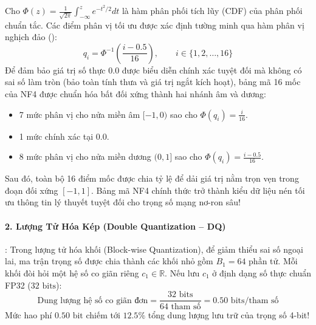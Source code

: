 Cho $\Phi(z) = \frac{1}{\sqrt{2\pi}} \int_{-\infty}^z e^{-t^2/2} dt$ là hàm phân phối tích lũy (CDF) của phân phối chuẩn tắc. Các điểm phân vị tối ưu được xác định tường minh qua hàm phân vị nghịch đảo ():
\begin{equation}
\label{eq:nf4-quantile-formula}
q_i = \Phi^{-1}\left( \frac{i - 0.5}{16} \right), \qquad i \in \{1, 2, \dots, 16\}
\end{equation}
Để đảm bảo giá trị số thực $0.0$ được biểu diễn chính xác tuyệt đối mà không có sai số làm tròn (bảo toàn tính thưa và giá trị ngắt kích hoạt), bảng mã 16 mốc của NF4 được chuẩn hóa bất đối xứng thành hai nhánh âm và dương:
\begin{itemize}
  \item 7 mức phân vị cho nửa miền âm $[-1, 0)$ sao cho $\Phi(q_i) = \frac{i}{16}$.
  \item 1 mức chính xác tại $0.0$.
  \item 8 mức phân vị cho nửa miền dương $(0, 1]$ sao cho $\Phi(q_i) = \frac{i - 0.5}{16}$.
\end{itemize}
Sau đó, toàn bộ 16 điểm mốc được chia tỷ lệ để dải giá trị nằm trọn vẹn trong đoạn đối xứng $[-1, 1]$. Bảng mã NF4 chính thức trở thành kiểu dữ liệu nén tối ưu thông tin lý thuyết tuyệt đối cho trọng số mạng nơ-ron sâu!

\paragraph{2. Lượng Tử Hóa Kép (Double Quantization -- DQ)}:
Trong lượng tử hóa khối (Block-wise Quantization), để giảm thiểu sai số ngoại lai, ma trận trọng số được chia thành các khối nhỏ gồm $B_1 = 64$ phần tử. Mỗi khối đòi hỏi một hệ số co giãn riêng $c_1 \in \mathbb{R}$.
Nếu lưu $c_1$ ở định dạng số thực chuẩn FP32 ($32\text{ bits}$):
\begin{equation}
\text{Dung lượng hệ số co giãn đơn} = \frac{32\text{ bits}}{64\text{ tham số}} = 0.50\text{ bits/tham số}
\end{equation}
Mức hao phí $0.50\text{ bit}$ chiếm tới $12.5\%$ tổng dung lượng lưu trữ của trọng số 4-bit!

